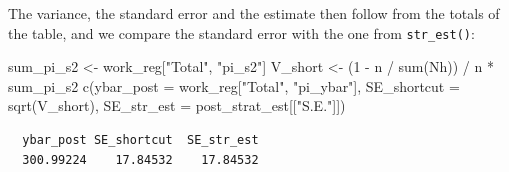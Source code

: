 \documentclass[
  letterpaper,
  DIV=11,
  numbers=noendperiod]{scrreprt}
\newenvironment{Shaded}{\begin{snugshade}}{\end{snugshade}}
\newcommand{\AttributeTok}[1]{\textcolor[rgb]{0.40,0.45,0.13}{#1}}
\newcommand{\DecValTok}[1]{\textcolor[rgb]{0.68,0.00,0.00}{#1}}
\newcommand{\FunctionTok}[1]{\textcolor[rgb]{0.28,0.35,0.67}{#1}}
\newcommand{\NormalTok}[1]{\textcolor[rgb]{0.00,0.23,0.31}{#1}}
\newcommand{\OtherTok}[1]{\textcolor[rgb]{0.00,0.23,0.31}{#1}}
\newcommand{\SpecialCharTok}[1]{\textcolor[rgb]{0.37,0.37,0.37}{#1}}
\newcommand{\StringTok}[1]{\textcolor[rgb]{0.13,0.47,0.30}{#1}}
\renewcommand{\[}{\begin{equation}}
\renewcommand{\]}{\end{equation}}
\begin{document}
\begin{table}

\caption{\label{tbl-agsrs-poststrat-shortcut}Short-cut formula working
table: post-stratification by region}


\end{table}%

The variance, the standard error and the estimate then follow from the
totals of the table, and we compare the standard error with the one from
\texttt{str\_est()}:

\begin{Shaded}
\begin{Highlighting}[]
\NormalTok{sum\_pi\_s2 }\OtherTok{\textless{}{-}}\NormalTok{ work\_reg[}\StringTok{"Total"}\NormalTok{, }\StringTok{"pi\_s2"}\NormalTok{]}
\NormalTok{V\_short }\OtherTok{\textless{}{-}}\NormalTok{ (}\DecValTok{1} \SpecialCharTok{{-}}\NormalTok{ n }\SpecialCharTok{/} \FunctionTok{sum}\NormalTok{(Nh)) }\SpecialCharTok{/}\NormalTok{ n }\SpecialCharTok{*}\NormalTok{ sum\_pi\_s2}
\FunctionTok{c}\NormalTok{(}\AttributeTok{ybar\_post =}\NormalTok{ work\_reg[}\StringTok{"Total"}\NormalTok{, }\StringTok{"pi\_ybar"}\NormalTok{], }\AttributeTok{SE\_shortcut =} \FunctionTok{sqrt}\NormalTok{(V\_short), }\AttributeTok{SE\_str\_est =}\NormalTok{ post\_strat\_est[[}\StringTok{"S.E."}\NormalTok{]])}
\end{Highlighting}
\end{Shaded}

\begin{verbatim}
  ybar_post SE_shortcut  SE_str_est 
  300.99224    17.84532    17.84532 
\end{verbatim}
\end{document}
